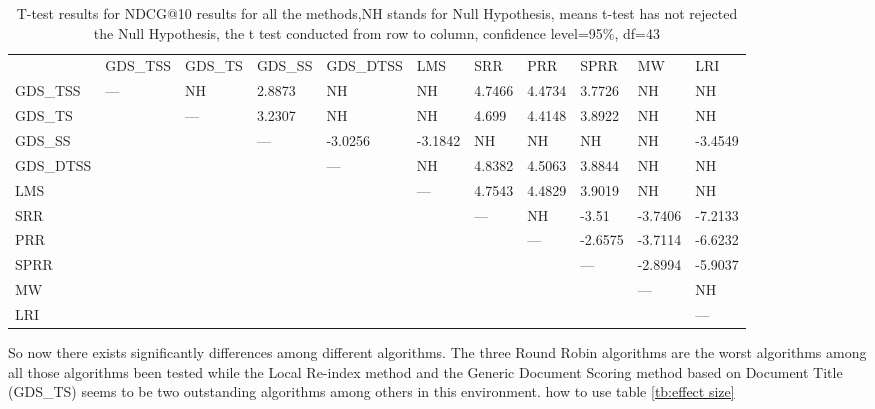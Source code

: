 \begin{table}
\tiny
\begin{tabular}{p{1cm}p{1cm}p{1cm}p{1cm}p{1cm}p{1cm}p{1cm}p{1cm}p{1cm}p{1cm}p{1cm}}
&GDS\_TSS&GDS\_TS&GDS\_SS&GDS\_DTSS&LMS&SRR&PRR&SPRR&MW&LRI\\
\cmidrule(lr){2-11}
GDS\_TSS&---&NH&2.8873&NH&NH&4.7466&4.4734&3.7726&NH&NH\\

GDS\_TS&&---&3.2307&NH&NH&4.699&4.4148&3.8922&NH&NH\\

GDS\_SS&&&---&-3.0256&-3.1842&NH&NH&NH&NH&-3.4549\\

GDS\_DTSS&&&&---&NH&4.8382&4.5063&3.8844&NH&NH\\

LMS&&&&&---&4.7543&4.4829&3.9019&NH&NH\\

SRR&&&&&&---&NH&-3.51&-3.7406&-7.2133\\

PRR&&&&&&&---&-2.6575&-3.7114&-6.6232\\

SPRR&&&&&&&&---&-2.8994&-5.9037\\

MW&&&&&&&&&---&NH\\

LRI&&&&&&&&&&---
\end{tabular}
\footnotesize
\caption{T-test results for NDCG@10 results for all the methods,NH stands for Null Hypothesis, means t-test has not rejected the Null Hypothesis, the t test conducted from row to column, confidence level=95\%, df=43}
\label{tb:ttest-allndcg}
\end{table}
So now there exists significantly differences among different algorithms. The three Round Robin algorithms are the worst algorithms among all those algorithms been tested while the Local Re-index method and the Generic Document Scoring method based on Document Title (GDS\_TS) seems to be two outstanding algorithms among others in this environment. 
{\color{red} how to use table \ref{tb:effect size}}

